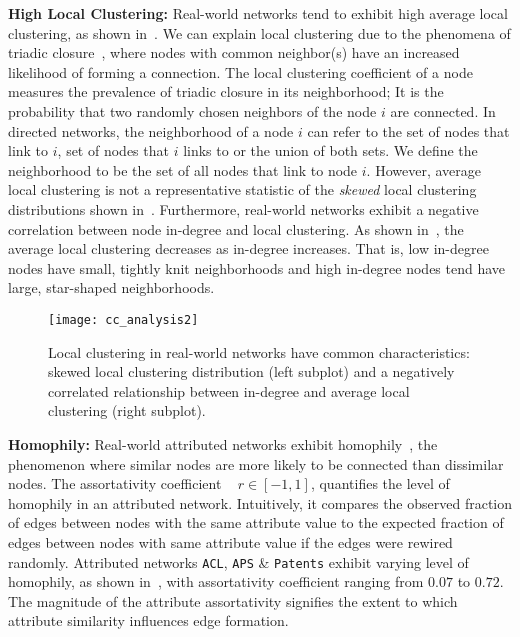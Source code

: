 \textbf{High Local Clustering:} Real-world networks tend to exhibit high average local clustering, as shown in~. We can explain local clustering due to the phenomena of triadic closure~\cite{simmel1950sociology,
newman2001clustering}, where nodes with common neighbor(s) have an increased
likelihood of forming a connection.
The local clustering coefficient of a node measures the prevalence of triadic closure in its neighborhood; It is the probability that two randomly chosen neighbors of the node $i$ are connected. In directed networks, the neighborhood of a node $i$ can refer to the
set of nodes that link to $i$, set of nodes that $i$ links to or the union of
both sets. We define the neighborhood to be the set of all nodes that link to
node $i$.  However, average local clustering is not a
representative statistic of the \textit{skewed} local clustering distributions
shown in~. Furthermore, real-world networks exhibit a negative
correlation between node in-degree  and local clustering. As shown in~, the average local clustering  decreases as in-degree increases.
That is, low in-degree nodes have small, tightly knit neighborhoods and high
in-degree nodes tend have large, star-shaped neighborhoods.


\begin{figure}
 \centering
 \texttt{[image: cc\_analysis2]}
 \caption{
    Local clustering in real-world networks have common characteristics:
    skewed local clustering distribution (left subplot) and a negatively correlated
    relationship between in-degree and average local clustering (right subplot).
 }
 \label{fig:cc_dc}
 \vspace{-15pt}
\end{figure}


\textbf{Homophily:}
Real-world attributed networks exhibit homophily~\cite{mcpherson2001birds}, the phenomenon where similar nodes are more likely
to be connected than dissimilar nodes. The assortativity coefficient
~\cite{newman2002assortative} $r \in [-1, 1]$,
quantifies the level of homophily in an attributed network. Intuitively, it
compares the observed fraction of edges between nodes with the same attribute
value to the expected fraction of edges between nodes with same attribute value
if the edges were rewired randomly.
Attributed networks \texttt{ACL}, \texttt{APS} \& \texttt{Patents} exhibit
varying level of homophily, as shown in~, with assortativity
coefficient ranging from $0.07$ to $0.72$.
The magnitude of the attribute assortativity
signifies the extent to which attribute similarity influences edge formation.


